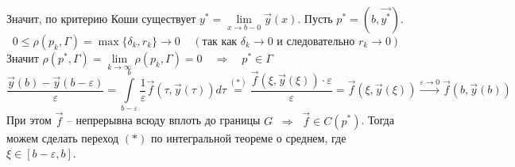 Значит, по критерию Коши существует $y^* = \lim\limits_{x\to b-0}\vec{y}(x)$.  Пусть $p^* = (b, \vec{y^*})$. 
\begin{equation*}
    0 \leqslant \rho(p_k,\Gamma) = \max\{\delta_k, r_k\} \to 0 \;\;\;\; (\text{так как $\delta_k\to 0$ и следовательно $r_k\to 0$})
\end{equation*}
Значит $\rho(p^*, \Gamma) = \lim\limits_{k\to\infty}\rho(p_k, \Gamma) = 0 \quad \Rightarrow \quad p^*\in\Gamma$
\begin{equation*}
    \frac{\vec{y}(b) - \vec{y}(b-\varepsilon)}{\varepsilon} = \int\limits_{b-\varepsilon}^{b} \frac{1}{\varepsilon}\vec{f}(\tau, \vec{y}(\tau))d\tau \stackrel{(*)}{=} \frac{\vec{f}(\xi, \vec{y}(\xi))\cdot \varepsilon}{\varepsilon} = \vec{f}(\xi, \vec{y}(\xi)) \stackrel{\varepsilon\to 0}{\longrightarrow} \vec{f}(b, \vec{y}(b))
\end{equation*}
При этом $\vec{f}$ -- непрерывна всюду вплоть до границы $G \;\; \Rightarrow \;\; \vec{f} \in C(p^*)$. Тогда можем сделать переход $(*)$ по интегральной теореме о среднем, где $\xi \in [b - \varepsilon, b]$.

